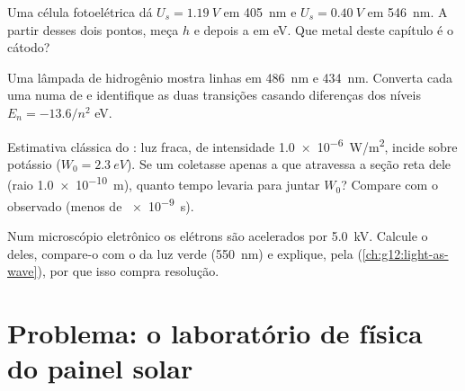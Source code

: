 \begin{exercise}[$\star\star\star$]\label{exo:g12:quantum-world:12}
Uma célula fotoelétrica dá $U_s = \qty{1.19}{V}$ em \qty{405}{nm} e
$U_s = \qty{0.40}{V}$ em \qty{546}{nm}. A partir desses dois pontos, meça $h$ e depois a
 em \unit{eV}. Que metal deste capítulo é o cátodo?
\end{exercise}

\begin{exercise}[$\star\star\star$]\label{exo:g12:quantum-world:13}
Uma lâmpada de hidrogênio mostra linhas em \qty{486}{nm} e \qty{434}{nm}. Converta cada
uma numa  de  e identifique as duas transições casando diferenças dos níveis
$E_n = -13.6/n^2$ \unit{eV}.
\end{exercise}

\begin{exercise}[$\star\star\star$]\label{exo:g12:quantum-world:14}
Estimativa clássica do : luz fraca, de intensidade \qty{1.0e-6}{W/m^2}, incide
sobre potássio ($W_0 = \qty{2.3}{eV}$). Se um  coletasse apenas a  que
atravessa a seção reta dele (raio \qty{1.0e-10}{m}), quanto tempo levaria para juntar
$W_0$? Compare com o  observado (menos de \qty{e-9}{s}).
\end{exercise}

\begin{exercise}[$\star\star\star$]\label{exo:g12:quantum-world:15}
Num microscópio eletrônico os elétrons são acelerados por \qty{5.0}{kV}. Calcule o
 deles, compare-o com o da luz verde (\qty{550}{nm}) e
explique, pela  (\cref{ch:g12:light-as-wave}), por que isso compra resolução.
\end{exercise}

\section{Problema: o laboratório de física do painel solar}

